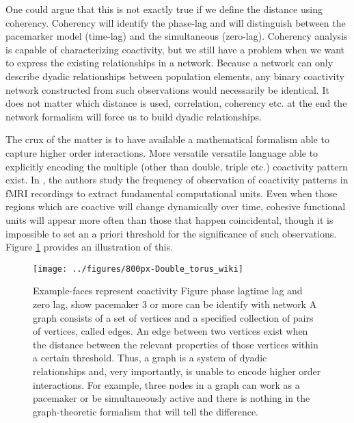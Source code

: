 \documentclass[onecollarge,runningheads]{svjour2}
\begin{document}
One could argue that this is not exactly true if we define the distance using coherency.
Coherency will identify the phase-lag and will distinguish between the pacemarker model (time-lag) and the simultaneous (zero-lag). %
Coherency analysis is capable of characterizing coactivity, but we still have a problem when we want to express the existing relationships in a network. Because a network can only describe dyadic relationships between population elements, any binary coactivity network constructed from such observations would necessarily be identical. It does not matter which distance is used, correlation, coherency etc. at the end the network formalism will force us to build dyadic relationships.

The crux of the matter is to have available a mathematical formalism able to capture higher order interactions. More versatile versatile language able to explicitly encoding the multiple (other than double, triple etc.) coactivity pattern exist. In \cite{ellis2014describing}, the authors study the frequency of observation of coactivity patterns in fMRI recordings to extract fundamental computational units. Even when those regions which are coactive will change dynamically over time, cohesive functional units will appear more often than those that happen coincidental, though it is impossible to set an a priori threshold for the significance of such observations. Figure \ref{ex:dyadic} provides an illustration of this.


\begin{figure}[h]
        \centering
        \texttt{[image: ../figures/800px-Double\_torus\_wiki]}
        \caption{Example-faces represent coactivity
        Figure phase lagtime lag and zero lag, show pacemaker 3 or more can be identify with network
        A graph consists of a set of vertices and a specified collection of pairs of vertices, called edges. An edge between two vertices exist when the distance between the relevant properties of those vertices within a certain threshold. Thus, a graph is a system of dyadic relationships and, very importantly, is unable to encode higher order interactions. For example, three nodes in a graph can work as a pacemaker or be simultaneously active and there is nothing in the graph-theoretic formalism that will tell the difference.}
\label{ex:dyadic}
\end{figure}
\end{document}
